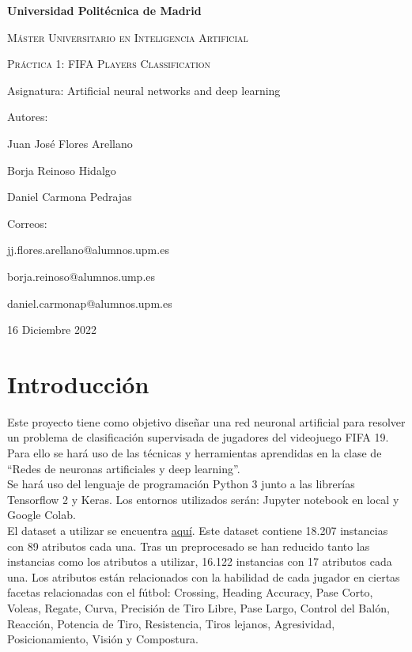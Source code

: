 \documentclass{article}
\begin{document}

\begin{titlepage}
	\centering
	{\bfseries\LARGE Universidad Polit\'ecnica de Madrid \par}
	\vspace{1cm}
	{\scshape\Large M\'aster Universitario en Inteligencia Artificial \par}
	\vspace{3cm}
	{\scshape\Huge Pr\'actica 1: FIFA Players Classification \par}
	\vspace{3cm}
	{\Large Asignatura: Artificial neural networks and deep learning \par}
	\vfill
	{\Large Autores: \par}
	{\Large Juan José Flores Arellano \par
	 		Borja Reinoso Hidalgo \par 
	 		Daniel Carmona Pedrajas \par}
	\vfill
	{\Large Correos: \par}
	{\Large jj.flores.arellano@alumnos.upm.es \par
			borja.reinoso@alumnos.ump.es \par 
	 		daniel.carmonap@alumnos.upm.es \par}	
	\vfill
	{\Large 16 Diciembre 2022 \par}
\end{titlepage}

\tableofcontents
\newpage

	\section{Introducci\'on}
	\label{intro}
		Este proyecto tiene como objetivo diseñar una red neuronal artificial para resolver un problema de clasificación supervisada de jugadores del videojuego FIFA 19. Para ello se hará uso de las técnicas y herramientas aprendidas en la clase de “Redes de neuronas artificiales y deep learning”.\\

	Se hará uso del lenguaje de programación Python 3 junto a las librerías Tensorflow 2 y Keras. Los entornos utilizados serán: Jupyter notebook en local y Google Colab.\\

	El dataset a utilizar se encuentra \href{https://www.kaggle.com/karangadiya/fifa19}{aqu\'i}. Este dataset contiene 18.207 instancias con 89 atributos cada una. Tras un preprocesado se han reducido tanto las instancias como los atributos a utilizar, 16.122 instancias con 17 atributos cada una. Los atributos están relacionados con la habilidad de cada jugador en ciertas facetas relacionadas con el fútbol: Crossing, Heading Accuracy, Pase Corto, Voleas, Regate, Curva, Precisión de Tiro Libre, Pase Largo, Control del Balón, Reacción, Potencia de Tiro, Resistencia, Tiros lejanos, Agresividad, Posicionamiento, Visión y Compostura.\\
\end{document}
